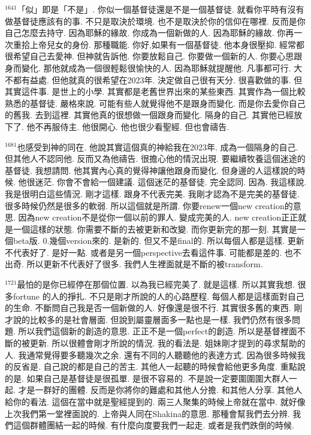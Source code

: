 \documentclass{book}
\begin{document}
$^{1641}$「似」即是「不是」.
你似一個基督徒還是不是一個基督徒.
就看你平時有沒有做基督徒應該有的事.
不只是取決於環境.
也不是取決於你的信仰在哪裡.
反而是你自己怎麼去持守.
因為耶穌的緣故.
你成為一個新做的人.
因為耶穌的緣故.
你再一次重拾上帝兒女的身份.
那種職能.
你好,如果有一個基督徒.
他本身很壓抑.
經常都很希望自己去愛神.
但神就告訴他.
你要放鬆自己.
你要做一個新的人.
你要心思跟身而變化.
那他就成為一個很輕鬆很愉快的人.
因為耶穌就提醒他.
凡事都可行.
大不都有益處.
但他就真的很希望在2023年.
決定做自己很有天分.
很喜歡做的事.
但其實這件事.
是世上的小學.
其實都是老舊世界出來的某些東西.
其實作為一個比較熟悉的基督徒.
嚴格來說.
可能有些人就覺得他不是跟身而變化.
而是你去愛你自己的舊我.
去到這裡.
其實他真的很想做一個跟身而變化.
隔身的自己.
其實他已經放下了.
他不再服侍主.
他很開心.
他也很少看聖經.
但也會禱告.

$^{1681}$也感受到神的同在.
他說其實這個真的神給我在2023年.
成為一個隔身的自己.
但其他人不認同他.
反而又為他禱告.
很擔心他的情況出現.
要繼續牧養這個迷途的基督徒.
我想請問.
他其實內心真的覺得神讓他跟身而變化.
但身邊的人這樣說的時候.
他很迷茫.
你會不會給一個建議.
這個迷茫的基督徒.
完全認同.
因為.
我這樣說.
我是很明白這些情況.
剛才這樣.
跟身不代表完美.
我剛才認為不是完美的基督徒.
很多時候仍然是很多的軟弱.
所以這個就是所謂.
你要renew一個new creation的意思.
因為new creation不是從你一個以前的罪人.
變成完美的人.
new creation正正就是一個這樣的狀態.
你需要不斷的去被更新和改變.
而你更新完的那一刻.
其實是一個beta版.
0.幾個version來的.
是新的.
但又不是final的.
所以每個人都是這樣.
更新不代表好了.
是好一點.
或者是另一個perspective去看這件事.
可能都是差的.
也不出奇.
所以更新不代表好了很多.
我們人生裡面就是不斷的被transform.

$^{1721}$最怕的是你已經停在那個位置.
以為我已經完美了.
就是這樣.
所以其實我想.
很多fortune 的人的掙扎.
不只是剛才所說的人的心路歷程.
每個人都是這樣面對自己的生命.
不斷問自己我是否一個新做的人.
好像還是很不行.
其實很多舊的東西.
剛才說的比較多的是社會層面.
但說到屬靈層面多一點也是一樣.
我們仍然有很多問題.
所以我們這個新的創造的意思.
正正不是一個perfect的創造.
所以是基督裡面不斷的被更新.
所以很體會剛才所說的情況.
我的看法是.
姐妹剛才提到的尋求幫助的人.
我通常覺得要多聽幾次之余.
還有不同的人聽聽他的表達方式.
因為很多時候我的反省是.
自己說的都是自己的苦主.
其他人一起聽的時候會給他更多角度.
重點說的是.
如果自己是基督徒是很孤單.
是很不容易的.
不是說一定要圍圍圍大群人一起.
才是一群好的團體.
反而是你將你的難處和其他人分擔.
和其他人分享.
其他人給你的看法.
這個在當中就是聖經提到的.
兩三人聚集的時候上帝就在當中.
就好像上次我們第一堂裡面說的.
上帝與人同在Shakina的意思.
那種會幫我們去分辨.
我們這個群體團結一起的時候.
有什麼向度要我們一起走.
或者是我們跌倒的時候.
\end{document}
